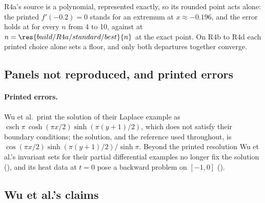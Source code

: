 R4a's source is a polynomial, represented exactly, so its rounded point acts alone: the printed $f'(-0.2)=0$ stands for an extremum at $x\approx-0.196$, and the error holds at  for every $n$ from 4 to 10, against  at $n=\res{build/R4a/standard/best}{n}$ at the exact point. On R4b to R4d each printed choice alone sets a floor, and only both departures together converge.

\subsection{Panels not reproduced, and printed errors}
\label{app:repro-unreproduced}

\paragraph{Printed errors.} Wu et al.\ print the solution of their Laplace example as $\operatorname{csch}\pi\,\cosh(\pi x/2)\sinh(\pi(y+1)/2)$, which does not satisfy their boundary conditions; the solution, and the reference used throughout, is $\cos(\pi x/2)\sinh(\pi(y+1)/2)/\sinh\pi$. Beyond the printed resolution Wu et al.'s invariant sets for their partial differential examples no longer fix the solution (), and its heat data at $t=0$ pose a backward problem on $[-1,0]$ ().

\subsection{Wu et al.'s claims}
\label{app:paper-claims}

